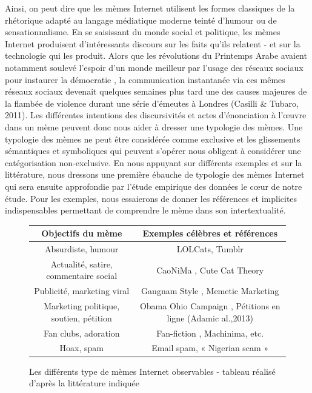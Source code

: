 Ainsi, on peut dire que les m\`emes Internet utilisent les formes
classiques de la rh\'etorique adapt\'e au langage m\'ediatique moderne
teint\'e d{\textquoteright}humour ou de sensationnalisme. En se
saisissant du monde social et politique, les m\`emes Internet
produisent d{\textquoteright}int\'eressants discours sur les faits
qu{\textquoteright}ils relatent - et sur la technologie qui les
produit. Alors que les r\'evolutions du Printemps Arabe avaient
notamment soulev\'e l{\textquoteright}espoir d{\textquoteright}un monde
meilleur par l{\textquoteright}usage des r\'eseaux sociaux pour
instaurer la d\'emocratie \citep{Lotan et al.2011}, la communication
instantan\'ee via ces m\^emes r\'eseaux sociaux devenait quelques
semaines plus tard une des causes majeures de la flamb\'ee de violence
durant une s\'erie d{\textquoteright}\'emeutes \`a Londres (Casilli \&
Tubaro, 2011). Les diff\'erentes intentions des discursivit\'es et
actes d{\textquoteright}\'enonciation \`a l{\textquoteright}{\oe}uvre
dans un m\`eme peuvent donc nous aider \`a dresser une typologie des
m\`emes. Une typologie des m\`emes ne peut \^etre consid\'er\'ee comme
exclusive et les glissements s\'emantiques et symboliques qui peuvent
s{\textquoteright}op\'erer nous obligent \`a consid\'erer une
cat\'egorisation non-exclusive. En nous appuyant sur diff\'erents
exemples et sur la litt\'erature, nous dressons une premi\`ere
\'ebauche de typologie des m\`emes Internet qui sera ensuite
approfondie par l{\textquoteright}\'etude empirique des donn\'ees le
c{\oe}ur de notre \'etude. Pour les exemples, nous essaierons de donner
les r\'ef\'erences et implicites indispensables permettant de
comprendre le m\`eme dans son intertextualit\'e.

\begin{figure}
    \centering
    \begin{tabular}{c|c}
    Objectifs du mème  & Exemples célèbres et références \\
    \hline
    Absurdiste, humour &  LOLCats, Tumblr \citep{Bauckhage2011} \\
    \hline
    Actualité, satire, commentaire social  & CaoNiMa \citep{Mina2012}, Cute Cat Theory \citep{Zuckerman2010} \\
    \hline
    Publicité, marketing viral & Gangnam Style \citep{Bolsover2013}, Memetic Marketing \citep{Flor2000} \\
    \hline
    Marketing politique, soutien, pétition & Obama Ohio Campaign \citep{Walker2012}, Pétitions en ligne (Adamic al.,2013) \\
    \hline
    Fan clubs, adoration  &  Fan-fiction , Machinima, etc. \\
    \hline
    Hoax, spam & Email spam, « Nigerian scam » \\
    \hline
    \end{tabular}

\caption[Typologie des mèmes]{Les diff\'erents type de m\`emes Internet observables - tableau r\'ealis\'e d{\textquoteright}apr\`es la litt\'erature indiqu\'ee}
\label{fig:typologie-memes}

\end{figure}


